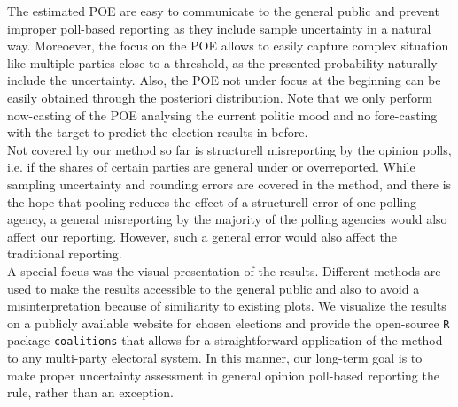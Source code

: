 \documentclass[smallcondensed]{svjour3}     %
\begin{document}
The estimated POE are easy to communicate to the general public and prevent improper poll-based reporting as they include sample uncertainty in a natural way. Moreoever, the focus on the POE allows to easily capture complex situation like multiple parties close to a threshold, as the presented probability naturally include the uncertainty. Also, the POE not under focus at the beginning can be easily obtained through the posteriori distribution. Note that we only perform now-casting of the POE analysing the current politic mood and no fore-casting with the target to predict the election results in before.\\

Not covered by our method so far is structurell misreporting by the opinion polls, i.e. if the shares of certain parties are general under or overreported. While sampling uncertainty and rounding errors are covered in the method, and there is the hope that pooling reduces the effect of a structurell error of one polling agency, a general misreporting by the majority of the polling agencies would also affect our reporting. However, such a general error would also affect the traditional reporting.\\ 

A special focus was the visual presentation of the results. Different methods are used to make the results accessible to the general public and also to avoid a misinterpretation because of similiarity to existing plots. We visualize the results on a publicly available website for chosen elections and provide the open-source \texttt{R} package \texttt{coalitions} that allows for a straightforward application of the method to any multi-party electoral system. In this manner, our long-term goal is to make proper uncertainty assessment in general opinion poll-based reporting the rule, rather than an exception.
\end{document}
